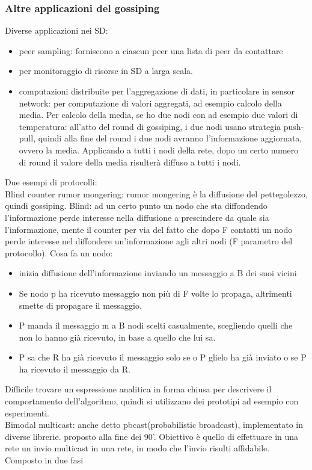 \documentclass[16px]{article}
\begin{document}
\subsubsection{Altre applicazioni del gossiping}
Diverse applicazioni nei SD:
\begin{itemize}
\item peer sampling: forniscono a ciascun peer una lista di peer da contattare
\item per monitoraggio di risorse in SD a larga scala.
\item computazioni distribuite per l'aggregazione di dati, in particolare in sensor network: per computazione di valori aggregati, ad esempio calcolo della media. Per calcolo della media, se ho due nodi con ad esempio due valori di temperatura: all'atto del round di gossiping, i due nodi usano strategia push-pull, quindi alla fine del round i due nodi avranno l'informazione aggiornata, ovvero la media. Applicando a tutti i nodi della rete, dopo un certo numero di round il valore della media risulterà diffuso a tutti i nodi.
\end{itemize}
Due esempi di protocolli:\\
Blind counter rumor mongering: rumor mongering è la diffusione del pettegolezzo, quindi gossiping. Blind: ad un certo punto un nodo che sta diffondendo l'informazione perde interesse nella diffusione a prescindere da quale sia l'informazione, mente il counter per via del fatto che dopo F contatti un nodo perde interesse nel diffondere un'informazione agli altri nodi (F parametro del protocollo). Cosa fa un nodo: 
\begin{itemize}
\item inizia diffusione dell'informazione inviando un messaggio a B dei suoi vicini
\item Se nodo p ha ricevuto messaggio non più di F volte lo propaga, altrimenti smette di propagare il messaggio.
\item P manda il messaggio m a B nodi scelti casualmente, scegliendo quelli che non lo hanno già ricevuto, in base a quello che lui sa.
\item P sa che R ha già ricevuto il messaggio solo se o P glielo ha già inviato o se P ha ricevuto il messaggio da R.
\end{itemize}
Difficile trovare un espressione analitica in forma chiusa per descrivere il comportamento dell'algoritmo, quindi si utilizzano dei prototipi ad esempio con esperimenti.\\ Bimodal multicast: anche detto pbcast(probabilistic broadcast), implementato in diverse librerie. proposto alla fine dei 90'. Obiettivo è quello di effettuare in una rete un invio multicast in una rete, in modo che l'invio risulti affidabile. Composto in due fasi
\end{document}
